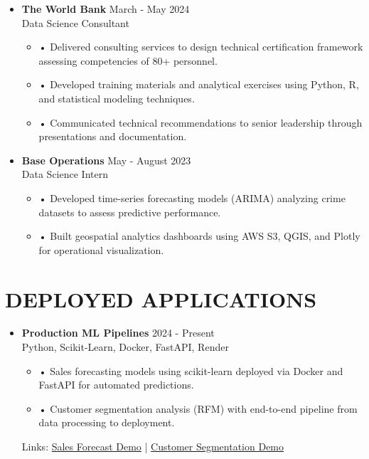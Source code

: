 \documentclass[a4paper,9pt]{extarticle}
\begin{document}
\noindent
\begin{itemize}[leftmargin=0.4cm, label={}]
    \item \textbf{The World Bank} \hfill March - May 2024 \\
    Data Science Consultant
    \vspace{-0.1cm}
    \begin{itemize}[leftmargin=0.3cm, label={}]
    \item \small{•} \normalsize{Delivered consulting services to design technical certification framework assessing competencies of 80+ personnel.}
    \item \small{•} \normalsize{Developed training materials and analytical exercises using Python, R, and statistical modeling techniques.}
    \item \small{•} \normalsize{Communicated technical recommendations to senior leadership through presentations and documentation.}
    \end{itemize}
\end{itemize}

\noindent
\begin{itemize}[leftmargin=0.4cm, label={}]
    \item \textbf{Base Operations} \hfill May - August 2023 \\
    Data Science Intern
    \vspace{-0.1cm}
    \begin{itemize}[leftmargin=0.3cm, label={}]
    \item \small{•} \normalsize{Developed time-series forecasting models (ARIMA) analyzing crime datasets to assess predictive performance.}
    \item \small{•} \normalsize{Built geospatial analytics dashboards using AWS S3, QGIS, and Plotly for operational visualization.}
    \end{itemize}
\end{itemize}

\section*{DEPLOYED APPLICATIONS}

\begin{itemize}[leftmargin=0.4cm, label={}]
    \item \textbf{Production ML Pipelines} \hfill 2024 - Present \\
    Python, Scikit-Learn, Docker, FastAPI, Render
    \begin{itemize}[leftmargin=0.3cm, label={}]
    \item \small{•} \normalsize{Sales forecasting models using scikit-learn deployed via Docker and FastAPI for automated predictions.} 
    \item \small{•} \normalsize{Customer segmentation analysis (RFM) with end-to-end pipeline from data processing to deployment.}
    \end{itemize}
    Links: \href{https://twallett.com/sales-forecast}{Sales Forecast Demo} | \href{https://twallett.com/customer-segmentation}{Customer Segmentation Demo} 
\end{itemize}
\end{document}
